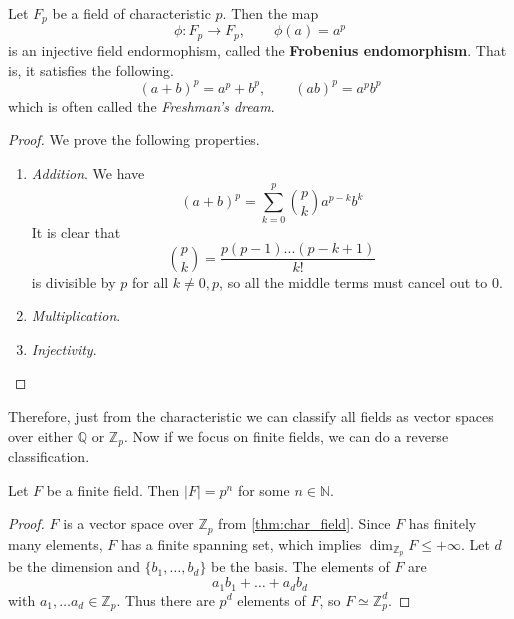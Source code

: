   \begin{definition}
    Let $F_p$ be a field of characteristic $p$. Then the map 
    \begin{equation}
      \phi: F_p \to F_p, \qquad \phi(a) = a^p
    \end{equation}
    is an injective field endormophism, called the \textbf{Frobenius endomorphism}. That is, it satisfies the following. 
    \begin{equation}
      (a + b)^p = a^p + b^p, \qquad (ab)^p = a^p b^p
    \end{equation}
    which is often called the \textit{Freshman's dream}. 
  \end{definition}
  \begin{proof}
    We prove the following properties. 
    \begin{enumerate}
      \item \textit{Addition}. We have 
      \begin{equation}
        (a + b)^p = \sum_{k = 0}^p \binom{p}{k} a^{p-k} b^{k}
      \end{equation}
      It is clear that 
      \begin{equation}
        \binom{p}{k} = \frac{p (p-1) ... (p - k+1)}{k!}
      \end{equation}
      is divisible by $p$ for all $k \neq 0, p$, so all the middle terms must cancel out to $0$. 

      \item \textit{Multiplication}. 

      \item \textit{Injectivity}. 
    \end{enumerate}
  \end{proof}

  Therefore, just from the characteristic we can classify all fields as vector spaces over either $\mathbb{Q}$ or $\mathbb{Z}_p$. Now if we focus on finite fields, we can do a reverse classification. 

  \begin{theorem}
    Let $F$ be a finite field. Then $|F| = p^n$ for some $n \in \mathbb{N}$. 
  \end{theorem}
  \begin{proof}
    $F$ is a vector space over $\mathbb{Z}_p$ from \ref{thm:char_field}. Since $F$ has finitely many elements, $F$ has a finite spanning set, which implies $\dim_{\mathbb{Z}_p} F \leq + \infty$. Let $d$ be the dimension and $\{b_1, \ldots, b_d\}$ be the basis. The elements of $F$ are 
    \begin{equation}
      a_1 b_1 + \ldots + a_d b_d
    \end{equation}
    with $a_1, \ldots a_d \in \mathbb{Z}_p$. Thus there are $p^d$ elements of $F$, so $F \simeq \mathbb{Z}_p^d$. 
  \end{proof}

